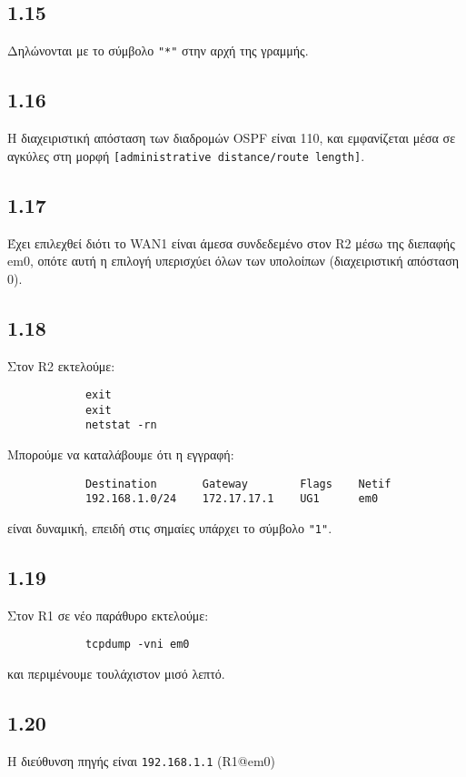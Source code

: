 \documentclass[a4paper, 12pt]{article}
\begin{document}
	\subsection*{1.15}
		Δηλώνονται με το σύμβολο \verb|"*"| στην αρχή της γραμμής.

	\subsection*{1.16}
		Η διαχειριστική απόσταση των διαδρομών OSPF είναι 110, και εμφανίζεται μέσα σε αγκύλες στη μορφή \verb|[administrative distance/route length]|.

	\subsection*{1.17}
		Έχει επιλεχθεί διότι το WAN1 είναι άμεσα συνδεδεμένο στον R2 μέσω της διεπαφής em0, οπότε αυτή η επιλογή υπερισχύει όλων των υπολοίπων (διαχειριστική απόσταση 0).

	\subsection*{1.18}
		Στον R2 εκτελούμε:
		
		\begin{verbatim}
			exit
			exit
			netstat -rn
		\end{verbatim}
		
		Μπορούμε να καταλάβουμε ότι η εγγραφή:
		
		\begin{verbatim}
			Destination       Gateway        Flags    Netif
			192.168.1.0/24    172.17.17.1    UG1      em0
		\end{verbatim}
		
		είναι δυναμική, επειδή στις σημαίες υπάρχει το σύμβολο \verb|"1"|.

	\subsection*{1.19}
		Στον R1 σε νέο παράθυρο εκτελούμε:
		
		\begin{verbatim}
			tcpdump -vni em0
		\end{verbatim}
		
		και περιμένουμε τουλάχιστον μισό λεπτό.

	\subsection*{1.20}
		Η διεύθυνση πηγής είναι \verb|192.168.1.1| (R1@em0)
\end{document}
